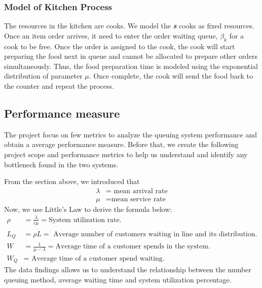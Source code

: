 \subsubsection{Model of Kitchen Process}
The resources in the kitchen are cooks. We model the \textit{\textbf{s}} cooks as fixed resources.
Once an item order arrives, it need to enter the order waiting queue, $\beta_{k}$ for a cook to be free.
Once the order is assigned to the cook, the cook will start preparing the food next in queue and cannot be allocated to prepare other orders simultaneously. Thus, the food preparation time is modeled using the exponential distribution of parameter $\mu$.
Once complete, the cook will send the food back to the counter and repeat the process.

\subsection{Performance measure}
The project focus on few metrics to analyze the queuing system performance and obtain a average performance measure. Before that, we create the following project scope and performance metrics to help us understand and identify any bottleneck found in the two systems.

From the section above, we introduced that
\begin{align*}
    \lambda & =\text{ mean arrival rate} \\
    \mu     & = \text{mean service rate}
\end{align*}
Now, we use Little's Law to derive the formula below:
\begin{align*}
    \rho & = \frac{\lambda}{c\mu} = \text{System utilization rate}.                                  \\
    L_Q  & = \rho \dot L =\text{ Average number of customers waiting in line and its distribution.} \\
    W    & = \frac{1}{\mu - \lambda}=\text{Average time of a customer spends in the system.}        \\
    W_Q  & = \text{ Average time of a customer spend waiting.}
\end{align*}
The data findings allows us to understand the relationship between the number queuing method, average waiting time and system utilization percentage.